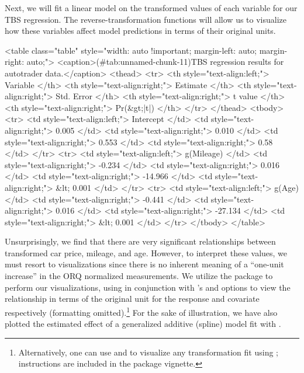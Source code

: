 Next, we will fit a linear model on the transformed values of each
variable for our TBS regression. The reverse-transformation functions
will allow us to visualize how these variables affect model predictions
in terms of their original units.

\begin{Schunk}
\end{Schunk}

\begin{Schunk}
<table class="table" style="width: auto !important; margin-left: auto; margin-right: auto;">
<caption>(\#tab:unnamed-chunk-11)TBS regression results for autotrader data.</caption>
 <thead>
  <tr>
   <th style="text-align:left;"> Variable </th>
   <th style="text-align:right;"> Estimate </th>
   <th style="text-align:right;"> Std. Error </th>
   <th style="text-align:right;"> t value </th>
   <th style="text-align:right;"> Pr(&gt;|t|) </th>
  </tr>
 </thead>
<tbody>
  <tr>
   <td style="text-align:left;"> Intercept </td>
   <td style="text-align:right;"> 0.005 </td>
   <td style="text-align:right;"> 0.010 </td>
   <td style="text-align:right;"> 0.553 </td>
   <td style="text-align:right;"> 0.58 </td>
  </tr>
  <tr>
   <td style="text-align:left;"> g(Mileage) </td>
   <td style="text-align:right;"> -0.234 </td>
   <td style="text-align:right;"> 0.016 </td>
   <td style="text-align:right;"> -14.966 </td>
   <td style="text-align:right;"> &lt; 0.001 </td>
  </tr>
  <tr>
   <td style="text-align:left;"> g(Age) </td>
   <td style="text-align:right;"> -0.441 </td>
   <td style="text-align:right;"> 0.016 </td>
   <td style="text-align:right;"> -27.134 </td>
   <td style="text-align:right;"> &lt; 0.001 </td>
  </tr>
</tbody>
</table>

\end{Schunk}

Unsurprisingly, we find that there are very significant relationships
between transformed car price, mileage, and age. However, to interpret
these values, we must resort to visualizations since there is no
inherent meaning of a ``one-unit increase'' in the ORQ normalized
measurements. We utilize the  package \citep{visreg} to
perform our visualizations, using  in
conjunction with 's  and  options
to view the relationship in terms of the original unit for the response
and covariate respectively (formatting
omitted).\footnote{Alternatively, one can use  \citep{scales} and  \citep{ggplot2} to visualize any transformation fit using ; instructions are included in the package vignette.}
For the sake of illustration, we have also plotted the estimated effect
of a generalized additive (spline) model fit with 
\citep{mgcv}.

